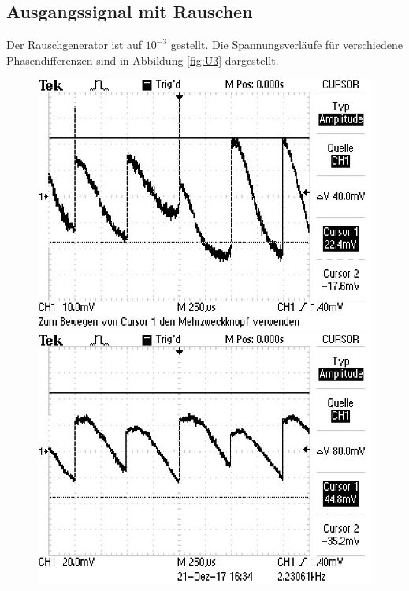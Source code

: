 \subsection{Ausgangssignal mit Rauschen}
\label{sec:mR}
Der Rauschgenerator ist auf $10^{-3}$ gestellt. Die Spannungsverläufe für verschiedene Phasendifferenzen sind in Abbildung \ref{fig:U3} dargestellt.

\begin{figure}
\centering
\begin{minipage}{0.48\textwidth}
\centering
{}
\includegraphics[scale=0.75]{content/images/noise0.jpg}
\end{minipage}
\begin{minipage}{0.48\textwidth}
\centering
{}
\includegraphics[scale=0.75]{content/images/noise45.jpg}
\end{minipage}


\end{figure}
